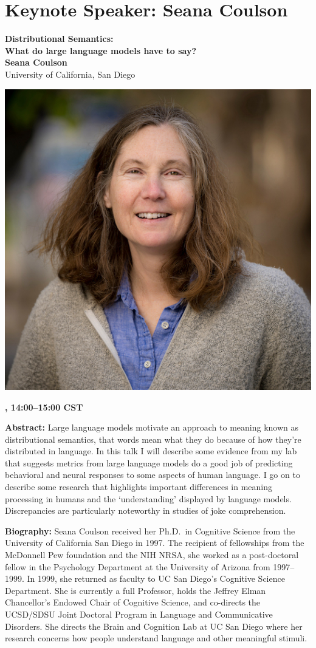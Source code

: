 \newpage
\section{Keynote Speaker: Seana Coulson}

\begin{center}
{\bfseries\Large Distributional Semantics:\\\vspace{2.0\lineskip}What do large language models have to say?} \\
\vspace{1.0em}
{\large\bf Seana Coulson} \\
University of California, San Diego

\includegraphics[width=0.4\linewidth]{content/day3/seana-headshot.png}

\textbf{\daydateyear{}, 14:00--15:00 CST}\\
\textbf{\PlenaryLoc{}}
\end{center}

\noindent
{\bfseries Abstract:} 
Large language models motivate an approach to meaning known as distributional semantics, that words mean what they do because of how they're distributed in language. In this talk I will describe some evidence from my lab that suggests metrics from large language models do a good job of predicting behavioral and neural responses to some aspects of human language. I go on to describe some research that highlights important differences in meaning processing in humans and the `understanding' displayed by language models. Discrepancies are particularly noteworthy in studies of joke comprehension.

\vspace{1em}

{\bfseries Biography:} 
Seana Coulson received her Ph.D.~in Cognitive Science from the University of California San Diego in 1997. The recipient of fellowships from the McDonnell Pew foundation and the NIH NRSA, she worked as a post-doctoral fellow in the Psychology Department at the University of Arizona from 1997--1999. In 1999, she returned as faculty to UC San Diego's Cognitive Science Department. She is currently a full Professor, holds the Jeffrey Elman Chancellor's Endowed Chair of Cognitive Science, and co-directs the UCSD/SDSU Joint Doctoral Program in Language and Communicative Disorders. She directs the Brain and Cognition Lab at UC San Diego where her research concerns how people understand language and other meaningful stimuli.

\newpage

